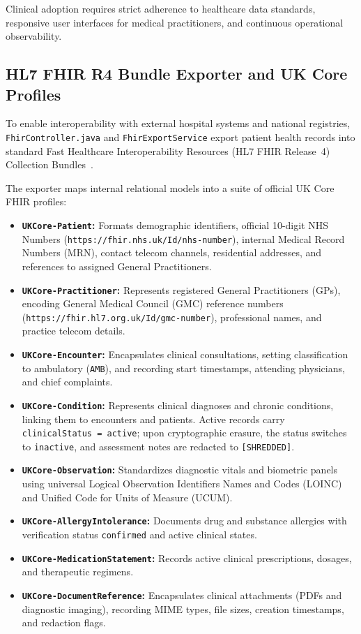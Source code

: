 Clinical adoption requires strict adherence to healthcare data standards, responsive user interfaces for medical practitioners, and continuous operational observability.

\subsection{HL7 FHIR R4 Bundle Exporter and UK Core Profiles}

To enable interoperability with external hospital systems and national registries, \texttt{FhirController.java} and \texttt{FhirExportService} export patient health records into standard Fast Healthcare Interoperability Resources (HL7 FHIR Release~4) Collection Bundles~\cite{hl7_fhir_r4}.

The exporter maps internal relational models into a suite of official UK Core FHIR profiles:
\begin{itemize}
    \item \textbf{\texttt{UKCore-Patient}:} Formats demographic identifiers, official 10-digit NHS Numbers (\texttt{https://fhir.nhs.uk/Id/nhs-number}), internal Medical Record Numbers (MRN), contact telecom channels, residential addresses, and references to assigned General Practitioners.
    \item \textbf{\texttt{UKCore-Practitioner}:} Represents registered General Practitioners (GPs), encoding General Medical Council (GMC) reference numbers (\texttt{https://fhir.hl7.org.uk/Id/gmc-number}), professional names, and practice telecom details.
    \item \textbf{\texttt{UKCore-Encounter}:} Encapsulates clinical consultations, setting classification to ambulatory (\texttt{AMB}), and recording start timestamps, attending physicians, and chief complaints.
    \item \textbf{\texttt{UKCore-Condition}:} Represents clinical diagnoses and chronic conditions, linking them to encounters and patients. Active records carry \texttt{clinicalStatus = active}; upon cryptographic erasure, the status switches to \texttt{inactive}, and assessment notes are redacted to \texttt{[SHREDDED]}.
    \item \textbf{\texttt{UKCore-Observation}:} Standardizes diagnostic vitals and biometric panels using universal Logical Observation Identifiers Names and Codes (LOINC) and Unified Code for Units of Measure (UCUM).
    \item \textbf{\texttt{UKCore-AllergyIntolerance}:} Documents drug and substance allergies with verification status \texttt{confirmed} and active clinical states.
    \item \textbf{\texttt{UKCore-MedicationStatement}:} Records active clinical prescriptions, dosages, and therapeutic regimens.
    \item \textbf{\texttt{UKCore-DocumentReference}:} Encapsulates clinical attachments (PDFs and diagnostic imaging), recording MIME types, file sizes, creation timestamps, and redaction flags.
\end{itemize}

